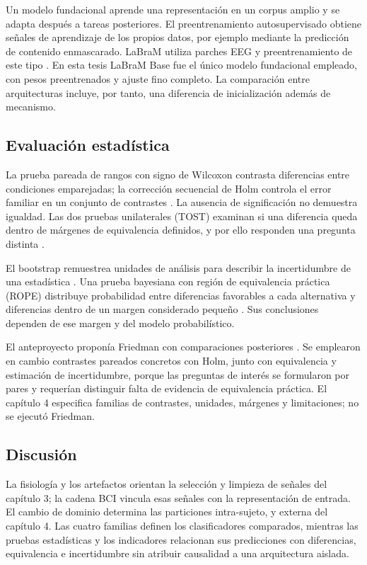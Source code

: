 Un modelo fundacional aprende una representación en un corpus amplio y se adapta después a tareas posteriores. El preentrenamiento autosupervisado obtiene señales de aprendizaje de los propios datos, por ejemplo mediante la predicción de contenido enmascarado. LaBraM utiliza parches EEG y preentrenamiento de este tipo \cite{jiang2024labram}. En esta tesis LaBraM Base fue el único modelo fundacional empleado, con pesos preentrenados y ajuste fino completo. La comparación entre arquitecturas incluye, por tanto, una diferencia de inicialización además de mecanismo.

\subsection{Evaluación estadística}
La prueba pareada de rangos con signo de Wilcoxon contrasta diferencias entre condiciones emparejadas; la corrección secuencial de Holm controla el error familiar en un conjunto de contrastes \cite{wilcoxon1945,holm1979}. La ausencia de significación no demuestra igualdad. Las dos pruebas unilaterales (TOST) examinan si una diferencia queda dentro de márgenes de equivalencia definidos, y por ello responden una pregunta distinta \cite{schuirmann1987,lakens2017}.

El bootstrap remuestrea unidades de análisis para describir la incertidumbre de una estadística \cite{efron1979}. Una prueba bayesiana con región de equivalencia práctica (ROPE) distribuye probabilidad entre diferencias favorables a cada alternativa y diferencias dentro de un margen considerado pequeño \cite{benavoli2017}. Sus conclusiones dependen de ese margen y del modelo probabilístico.

El anteproyecto proponía Friedman con comparaciones posteriores \cite{demsar2006statistical}. Se emplearon en cambio contrastes pareados concretos con Holm, junto con equivalencia y estimación de incertidumbre, porque las preguntas de interés se formularon por pares y requerían distinguir falta de evidencia de equivalencia práctica. El capítulo 4 especifica familias de contrastes, unidades, márgenes y limitaciones; no se ejecutó Friedman.

\subsection{Discusión}
La fisiología y los artefactos orientan la selección y limpieza de señales del capítulo 3; la cadena BCI vincula esas señales con la representación de entrada. El cambio de dominio determina las particiones intra-sujeto, \loso{} y externa del capítulo 4. Las cuatro familias definen los clasificadores comparados, mientras las pruebas estadísticas y los indicadores relacionan sus predicciones con diferencias, equivalencia e incertidumbre sin atribuir causalidad a una arquitectura aislada.
